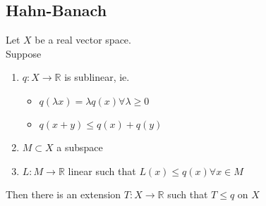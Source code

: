 \documentclass[../main.tex]{subfiles}
\begin{document}
\subsection{Hahn-Banach}
\begin{thm}
	Let $X$ be a real vector space.\\
	Suppose
	\begin{enumerate}
	\item $q: X\to \mathbb{R}$ is sublinear, ie.
		\begin{itemize}
		\item $q( \lambda x ) = \lambda q( x) \forall \lambda \geq 0$ 
		\item $q( x+y) \leq  q( x) + q( y) $ 
		\end{itemize}
		
	
	\item $M \subset X$ a subspace
	\item $L: M \to \mathbb{R}$ linear such that $L( x) \leq q( x) \forall x \in M$ 
	\end{enumerate}
	Then there is an extension $T:X\to \mathbb{R}$ such that $T \leq q$ on $X$
\end{thm}
\end{document}

